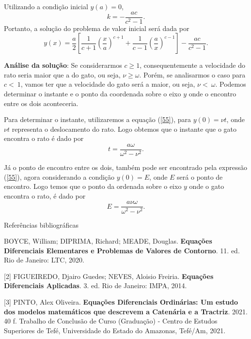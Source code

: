 \documentclass[blue]{beamer}
\numberwithin{equation}{section}
\begin{document}
\begin{frame}
	\justifying
\hspace{0.2cm} Utilizando a condição inicial $y(a) = 0$,
$$k = - \dfrac{ac}{c^2 - 1}.$$
Portanto, a solução do problema de valor inicial será dada por
\begin{equation} \label{55}
y(x) = \dfrac{a}{2} \left[\dfrac{1}{c+1} \left(\dfrac{x}{a}\right)^{c+1} + \dfrac{1}{c-1} \left(\dfrac{a}{x}\right)^{c-1} \right] - \dfrac{ac}{c^2 - 1}.
\end{equation}

\begin{flushleft}
	\justifying
	\textbf{Análise da solução}: Se considerarmos $c\geq1$, consequentemente a velocidade do rato seria maior que a do gato, ou seja, $\nu\geq\omega$. Porém, se analisarmos o caso para $c <\ 1$, vamos ter que a velocidade do gato será a maior, ou seja, $\nu <\ \omega$. Podemos determinar o instante e o ponto da coordenada sobre o eixo $y$ onde o encontro entre os dois aconteceria. \end{flushleft}
	
\end{frame}

\begin{frame}
	\justifying
\hspace{0.2cm} Para determinar o instante, utilizaremos a equação (\ref{55}), para $y(0) = \nu t$, onde $\nu t$ representa o deslocamento do rato. Logo obtemos que o instante que o gato encontra o rato é dado por
$$t = \dfrac{a\omega}{\omega^2 - \nu^2}.$$

\hspace{0.2cm} Já o ponto de encontro entre os dois, também pode ser encontrado pela expressão (\ref{55}), agora considerando a condição $y(0) = E$, onde $E$ será o ponto de encontro. Logo temos que o ponto da ordenada sobre o eixo $y$ onde o gato encontra o rato, é dado por
$$E = \dfrac{a\nu\omega}{\omega^2 - \nu^2}.$$
	
\end{frame}

\begin{frame}{Referências bibliográficas}

	\justifying
	[1]  BOYCE, William; DIPRIMA, Richard; MEADE, Douglas. \textbf{Equações Diferenciais Elementares e Problemas de Valores de Contorno}. 11. ed. Rio de Janeiro: LTC, 2020. 
	\vspace{0.5cm}
	
	[2] FIGUEIREDO, Djairo Guedes; NEVES, Aloisio Freiria. \textbf{Equações Diferenciais Aplicadas}. 3. ed. Rio de Janeiro: IMPA, 2014.
		\vspace{0.5cm}

	[3] PINTO, Alex Oliveira. \textbf{Equações Diferenciais Ordinárias: Um estudo dos modelos matemáticos que descrevem a Catenária e a Tractriz}. 2021. 40 f. Trabalho de Conclusão de Curso (Graduação) - Centro de Estudos Superiores de Tefé, Universidade do Estado do Amazonas, Tefé/Am, 2021.


\end{frame}
\end{document}
